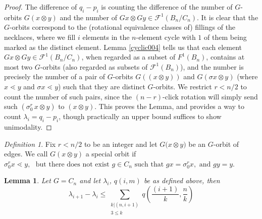\documentclass{amsart}
\newtheorem{lem}[thm]{Lemma}
\theoremstyle{remark}
\newtheorem{defn}[thm]{Definition}
\begin{document}
\begin{proof}

 The difference of $q_i - p_i$ is counting the difference of the number of $G$-orbits $G (x \otimes y)$ and the number of $Gx \otimes Gy \in \mathcal F^1(B_n/C_n)$. It is clear that the $G$-orbits correspond to the (rotational equivalence classes of) fillings of the necklaces, where we fill $i$ elements in the  $n$-element cycle with $1$ of them being marked as the distinct element. Lemma \ref{cyclic004} tells us that each element $Gx \otimes Gy \in \mathcal F^1 (B_n/C_n)$, when regarded as a subset of $F^1(B_n)$,  contains at most two $G$-orbits (also regarded as subsets of $\mathcal F^1 (B_n)$), and the number is precisely the number of a pair of $G$-orbits $G ({(x \otimes y)})$ and $G{(\sigma x \otimes y )}$ (where $ x \lessdot y$ and $\sigma x \lessdot y$) such that they are distinct $G$-orbits. We restrict $r < n/2$  to count the number of such pairs, since the $(n -r)$-click rotation will simply send such $(\sigma_0^r \, x \otimes  y)$ to $(x \otimes y)$. This proves the Lemma, and provides a way to count $\lambda_i = q_i - p_i$, though practically an upper bound suffices to show unimodality. 
\end{proof}


\begin{defn}
Fix $r < n/2$ to be an integer and let $ G({x\otimes y)}$ be an $G$-orbit of edges. We call $G(x \otimes y)$ a special orbit if  $ \sigma_0^r x \lessdot y, \, \, \text{ but  there does not exist } g \in C_n \text{ such that } g x = \sigma_0 ^r x,  \text{ and }g y = y$. 

\end{defn}

\begin{lem}{\label{lem:cyclic_bounding_lambda}} 
Let $G =C_n$ and let $\lambda_i$, $q(i,m)$ be as defined above,  then $$\lambda_{i+1} - \lambda_i \le \sum_{\substack{k | (n , i+1) \\ 3 \le k }} q (\frac{(i+1)}{k},\frac{n}{k}) $$ 
\end{lem}
\end{document}
